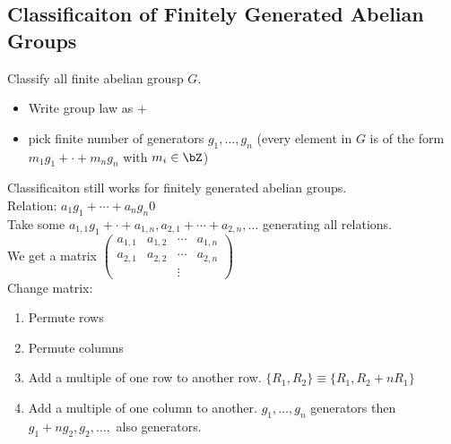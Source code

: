 
\subsection{Classificaiton of Finitely Generated Abelian Groups}

Classify all finite abelian grousp $G$. 
\begin{itemize}
    \item Write group law as + 
    \item pick finite number of generators $g_1, \ldots, g_n$ (every element in $G$ is of the form $m_1g_1 + \cdot + m_ng_n$ with $m_i \in \bZ$) 
\end{itemize}

\noindent
Classificaiton still works for finitely generated abelian groups. \\
Relation: $a_1 g_1 + \cdots + a_ng_n 0$ \\
Take some $a_{1,1}g_1 + \cdot + a_{1,n}, a_{2, 1} + \cdots + a_{2,n}, \ldots $ generating all relations. \\
We get a matrix $\begin{pmatrix} a_{1,1} & a_{1,2} & \cdots & a_{1,n} \\ a_{2,1} & a_{2,2} & \cdots & a_{2,n} \\ & & \vdots & \end{pmatrix}$ \\
Change matrix:
\begin{enumerate}
    \item Permute rows 
    \item Permute columns 
    \item Add a multiple of one row to another row. $\{R_1, R_2\} \equiv \{R_1, R_2 + nR_1\}$ 
    \item Add a multiple of one column to another. $g_1, \ldots, g_n$ generators then $g_1 + ng_2, g_2, \ldots, $ also generators.  
\end{enumerate}

